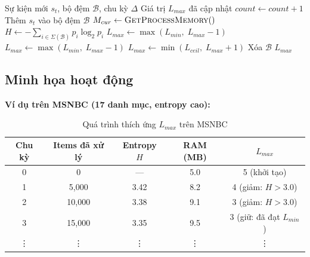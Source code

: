 \documentclass[a4paper,12pt]{report}
\begin{document}
\begin{algorithm}[H]
\caption{Cập nhật maxPatternLength Thích ứng}
\label{alg:adaptive}
\begin{algorithmic}[1]
\REQUIRE Sự kiện mới $s_t$, bộ đệm $\mathcal{B}$, chu kỳ $\Delta$
\ENSURE Giá trị $L_{max}$ đã cập nhật
\STATE $\textit{count} \leftarrow \textit{count} + 1$
\STATE Thêm $s_t$ vào bộ đệm $\mathcal{B}$
    \STATE $M_{cur} \leftarrow \textsc{GetProcessMemory}()$ 
    \STATE $H \leftarrow -\sum_{i \in \Sigma(\mathcal{B})} p_i \log_2 p_i$ 
        \STATE $L_{max} \leftarrow \max(L_{min},\; L_{max} - 1)$ 
        \STATE $L_{max} \leftarrow \max(L_{min},\; L_{max} - 1)$ 
        \STATE $L_{max} \leftarrow \min(L_{ceil},\; L_{max} + 1)$ 
    \ENDIF
    \STATE Xóa $\mathcal{B}$ 
\ENDIF
\RETURN $L_{max}$
\end{algorithmic}
\end{algorithm}

\subsection{Minh họa hoạt động}
\textbf{Ví dụ trên MSNBC (17 danh mục, entropy cao):}

\begin{table}[H]
    \centering
    \caption{Quá trình thích ứng $L_{max}$ trên MSNBC}
    \label{tab:adaptive_example}
    \begin{tabular}{ccccc}
        \toprule
        \textbf{Chu kỳ} & \textbf{Items đã xử lý} & \textbf{Entropy $H$} & \textbf{RAM (MB)} & $L_{max}$ \\
        \midrule
        0  & 0      & ---   & 5.0   & 5 (khởi tạo) \\
        1  & 5,000  & 3.42  & 8.2   & 4 (giảm: $H > 3.0$) \\
        2  & 10,000 & 3.38  & 9.1   & 3 (giảm: $H > 3.0$) \\
        3  & 15,000 & 3.35  & 9.5   & 3 (giữ: đã đạt $L_{min}$) \\
        \vdots & \vdots & \vdots & \vdots & \vdots \\
        \bottomrule
    \end{tabular}
\end{table}
\end{document}

